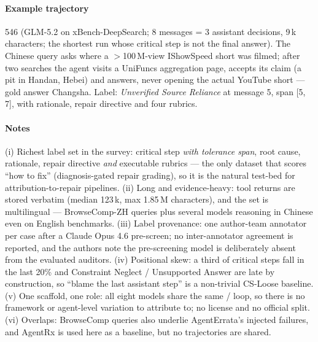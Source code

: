 \paragraph{Example trajectory}  546 (GLM-5.2 on xBench-DeepSearch; 8 messages = 3 assistant decisions, 9\,k characters; the shortest run whose critical step is not the final answer). The Chinese query asks where a $>$100\,M-view IShowSpeed short was filmed; after two searches the agent visits a UniFuncs aggregation page, accepts its claim (a pit in Handan, Hebei) and answers, never opening the actual YouTube short --- gold answer Changsha. Label: \emph{Unverified Source Reliance} at message 5, span [5, 7], with rationale, repair directive and four rubrics.


\paragraph{Notes} (i) Richest label set in the survey: critical step \emph{with tolerance span}, root cause, rationale, repair directive \emph{and} executable rubrics --- the only dataset that scores ``how to fix'' (diagnosis-gated repair grading), so it is the natural test-bed for attribution-to-repair pipelines. (ii) Long and evidence-heavy: tool returns are stored verbatim (median 123\,k, max 1.85\,M characters), and the set is multilingual --- BrowseComp-ZH queries plus several models reasoning in Chinese even on English benchmarks. (iii) Label provenance: one author-team annotator per case after a Claude Opus 4.6 pre-screen; no inter-annotator agreement is reported, and the authors note the pre-screening model is deliberately absent from the evaluated auditors. (iv) Positional skew: a third of critical steps fall in the last 20\% and Constraint Neglect / Unsupported Answer are late by construction, so ``blame the last assistant step'' is a non-trivial CS-Loose baseline. (v) One scaffold, one role: all eight models share the same / loop, so there is no framework or agent-level variation to attribute to; no license and no official split. (vi) Overlaps: BrowseComp queries also underlie AgentErrata's injected failures, and AgentRx is used here as a baseline, but no trajectories are shared.
